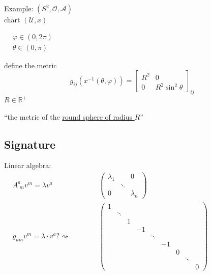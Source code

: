 	\underline{Example}: $(S^2, \mathcal{O}, \mathcal{A})$ \\ 
	\phantom{example } chart $(\mathcal{U}, x)$
	
	$\begin{aligned} 
	& \varphi \in (0,2\pi ) \\ 
	& \theta \in (0,\pi)\end{aligned}$
	
	\underline{define} the metric
	\[
	g_{ij}(x^{-1}(\theta,\varphi)) = \left[ \begin{matrix} R^2 & 0 \\
	0 & R^2\sin^2{\theta} \end{matrix} \right]_{ij}
	\]
	$R \in \mathbb{R}^+$
	
	``the metric of the \underline{round sphere of radius $R$}''
	
	\subsection{Signature} 
	
	Linear algebra: \quad \quad \, $ \begin{aligned} & A^a_{\,\,m}v^m = \lambda v^a & \quad \quad \quad \, \left( \begin{matrix} \lambda_1 & & 0 \\
	& \ddots & \\ 
	0 & & \lambda_n \end{matrix} \right) \\
	& g_{am} v^m = \lambda \cdot v^a ? \rightsquigarrow  & \quad \quad \quad \, \left( \begin{matrix} 
	1        &   &    &        &    &   &        & \\
	& \ddots &   &    &        &    &   &        & \\
	&        & 1 &    &        &    &   &        & \\
	&        &   & -1 &        &    &   &        & \\
	&        &   &    & \ddots &    &   &        & \\
	&        &   &    &        & -1 &   &        & \\
	&        &   &    &        &    & 0 &        & \\
	&        &   &    &        &    &   & \ddots & \\
	&        &   &    &        &    &   &        & 0 \end{matrix} \right)
	\end{aligned}$
	
